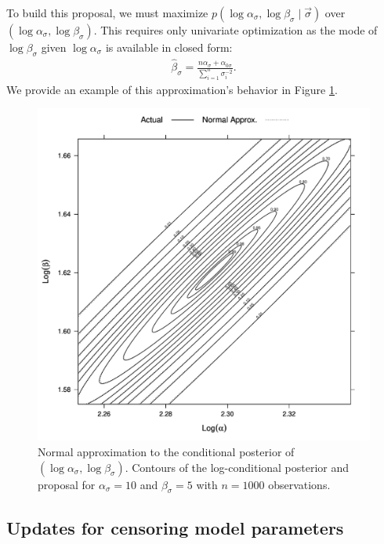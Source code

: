 To build this proposal, we must maximize $p(\log \alpha_{\sigma}, \log \beta_{\sigma} \mid \vec{\sigma})$ over $(\log \alpha_{\sigma}, \log \beta_{\sigma})$.
This requires only univariate optimization as the mode of $\log \beta_\sigma$ given $\log \alpha_\sigma$ is available in closed form:
\begin{eqnarray}
\hat{\beta}_{\sigma} = \frac{n\alpha_{\sigma} + \alpha_{0 \sigma}}{\sum_{i=1}^{n}\sigma_{i}^{-2}} .
\end{eqnarray}
We provide an example of this approximation's behavior in Figure \ref{supp:proteomics:fig:Normal-approximation-to-log-gamma-pars}.

\begin{figure}
\centering
\includegraphics[width=\textwidth]{figures/proteomics/gamma_normal_approx}

\caption{Normal approximation to the conditional posterior of $(\log \alpha_\sigma, \log \beta_\sigma)$. Contours of the log-conditional posterior and proposal for $\alpha_\sigma=10$ and $\beta_\sigma=5$ with $n=1000$ observations.\label{supp:proteomics:fig:Normal-approximation-to-log-gamma-pars}} 
\end{figure}




\subsection{Updates for censoring model parameters}


